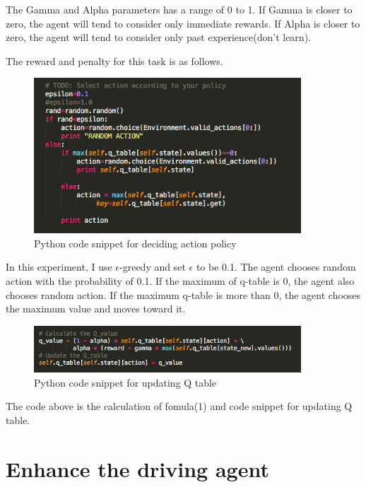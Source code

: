 \documentclass[a4paper,11pt]{article}
\begin{document}
The Gamma and Alpha parameters has a range of 0 to 1. If Gamma is closer to zero, the agent will tend to consider only immediate rewards. If Alpha is closer to zero, the agent will tend to consider only past experience(don't learn).

The reward and penalty for this task is as follows.




\begin{figure}[H]
\begin{center}
\includegraphics[width=100mm]{graph/python_code.jpg}
\end{center}
\caption{Python code snippet for deciding action policy}
\label{fig:1}
\end{figure}

In this experiment, I use $\epsilon$-greedy  and set $\epsilon$ to be 0.1. The agent chooses random action with the probability of 0.1. If the maximum of q-table is 0, the agent also chooses random action. If the maximum q-table is more than 0, the agent chooses the maximum value and moves toward it.


\begin{figure}[H]
\begin{center}
\includegraphics[width=100mm]{graph/python_code2.jpg}
\end{center}
\caption{Python code snippet for updating Q table}
\label{fig:2}
\end{figure}
The code above is the calculation of fomula(1) and code snippet for updating Q table.

\section{Enhance the driving agent}
\end{document}
